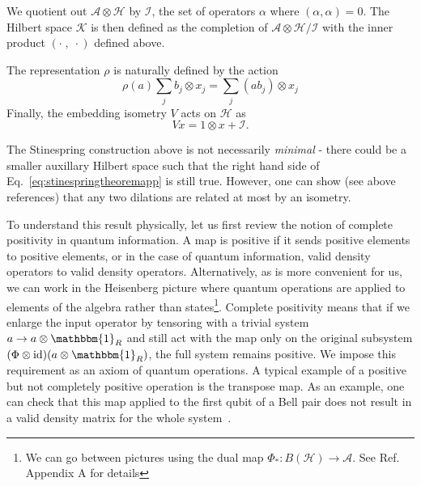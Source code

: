 \documentclass{article}
\theoremstyle{definition}
\begin{document}
  We quotient out $\mathcal{A}\otimes \mathcal{H}$ by $\mathcal{I}$, the set of
  operators $\alpha$ where $(\alpha, \alpha) = 0$. The Hilbert space $\mathcal{K}$
  is then defined as the completion of $\mathcal{A}\otimes \mathcal{H}/\mathcal{I}$
  with the inner product $(\cdot\;,\;\cdot)$ defined above.

  The representation $\rho$ is naturally defined by the action
\begin{equation}
    \rho(a) \sum_{j}b_{j}\otimes x_{j}= \sum_{j}(ab_{j})\otimes x_{j}
\end{equation}
  Finally, the embedding isometry $V$ acts on $\mathcal{H}$ as
\begin{equation}
    Vx = 1 \otimes x + \mathcal{I}.
\end{equation}

  The Stinespring construction above is not necessarily \textit{minimal} - there
  could be a smaller auxillary Hilbert space such that the right hand side of Eq.~\ref{eq:stinespringtheoremapp}
  is still true. However, one can show (see above references) that any two
  dilations are related at most by an isometry.

  To understand this result physically, let us first review the notion of complete
  positivity in quantum information. A map is positive if it sends positive
  elements to positive elements, or in the case of quantum information, valid
  density operators to valid density operators. Alternatively, as is more
  convenient for us, we can work in the Heisenberg picture where quantum operations
  are applied to elements of the algebra rather than states\footnote{We can go
  between pictures using the dual map
  $\Phi_{*}: B(\mathcal{H}) \rightarrow \mathcal{A}$. See Ref.~\cite{furuya2022real}
  Appendix A for details}. Complete positivity means that if we enlarge the input
  operator by tensoring with a trivial system $a \rightarrow a \otimes \mathbbm{1}
  _{R}$ and still act with the map only on the original subsystem $(\Phi\otimes \text{id}
  )(a \otimes \mathbbm{1}_{R})$, the full system remains positive. We impose this
  requirement as an axiom of quantum operations. A typical example of a positive
  but not completely positive operation is the transpose map. As an example, one
  can check that this map applied to the first qubit of a Bell pair does not
  result in a valid density matrix for the whole system~\cite{Nielsen_Chuang_2010}.
\end{document}
